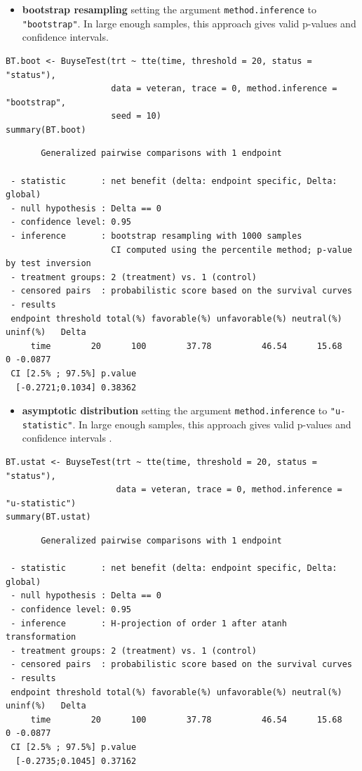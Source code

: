 \documentclass[12pt]{article}
\begin{document}
\begin{itemize}
\item \textbf{bootstrap resampling} setting the argument \texttt{method.inference} to
\texttt{"bootstrap"}. In large enough samples, this approach gives valid
p-values and confidence intervals.
\end{itemize}

\lstset{language=r,label= ,caption= ,captionpos=b,numbers=none}
\begin{lstlisting}
BT.boot <- BuyseTest(trt ~ tte(time, threshold = 20, status = "status"),
                     data = veteran, trace = 0, method.inference = "bootstrap",
                     seed = 10) 
summary(BT.boot)
\end{lstlisting}

\begin{verbatim}
       Generalized pairwise comparisons with 1 endpoint

 - statistic       : net benefit (delta: endpoint specific, Delta: global) 
 - null hypothesis : Delta == 0 
 - confidence level: 0.95 
 - inference       : bootstrap resampling with 1000 samples 
                     CI computed using the percentile method; p-value by test inversion 
 - treatment groups: 2 (treatment) vs. 1 (control) 
 - censored pairs  : probabilistic score based on the survival curves
 - results
 endpoint threshold total(%) favorable(%) unfavorable(%) neutral(%) uninf(%)   Delta
     time        20      100        37.78          46.54      15.68        0 -0.0877
 CI [2.5% ; 97.5%] p.value 
  [-0.2721;0.1034] 0.38362
\end{verbatim}

\begin{itemize}
\item \textbf{asymptotic distribution} setting the argument \texttt{method.inference} to
\texttt{"u-statistic"}. In large enough samples, this approach gives valid
p-values and confidence intervals \citep{ozenne2021asymptotic}.
\end{itemize}

\lstset{language=r,label= ,caption= ,captionpos=b,numbers=none}
\begin{lstlisting}
BT.ustat <- BuyseTest(trt ~ tte(time, threshold = 20, status = "status"),
                      data = veteran, trace = 0, method.inference = "u-statistic") 
summary(BT.ustat)
\end{lstlisting}

\begin{verbatim}
       Generalized pairwise comparisons with 1 endpoint

 - statistic       : net benefit (delta: endpoint specific, Delta: global) 
 - null hypothesis : Delta == 0 
 - confidence level: 0.95 
 - inference       : H-projection of order 1 after atanh transformation 
 - treatment groups: 2 (treatment) vs. 1 (control) 
 - censored pairs  : probabilistic score based on the survival curves
 - results
 endpoint threshold total(%) favorable(%) unfavorable(%) neutral(%) uninf(%)   Delta
     time        20      100        37.78          46.54      15.68        0 -0.0877
 CI [2.5% ; 97.5%] p.value 
  [-0.2735;0.1045] 0.37162
\end{verbatim}
\end{document}
